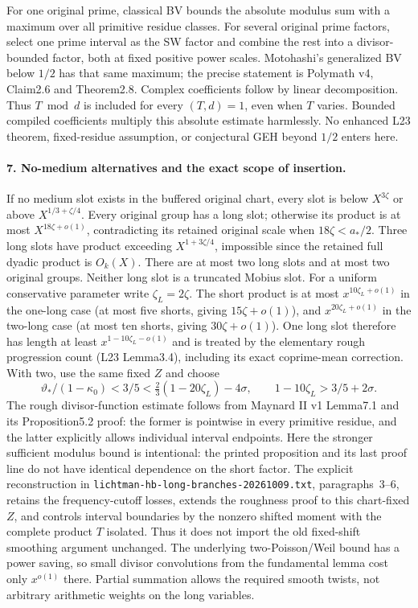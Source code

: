 For one original prime, classical BV bounds the absolute modulus sum
with a maximum over all primitive residue classes. For several original
prime factors, select one prime interval as the SW factor and combine
the rest into a divisor-bounded factor, both at fixed positive power
scales. Motohashi's generalized BV below $1/2$ has that same maximum;
the precise statement is Polymath v4, Claim2.6 and Theorem2.8. Complex
coefficients follow by linear decomposition. Thus $T\bmod d$ is included
for every $(T,d)=1$, even when $T$ varies. Bounded compiled coefficients
multiply this absolute estimate harmlessly. No enhanced L23 theorem,
fixed-residue assumption, or conjectural GEH beyond $1/2$ enters here.

\paragraph{7. No-medium alternatives and the exact scope of insertion.}
If no medium slot exists in the buffered original chart, every slot
is below $X^{3\zeta}$ or above $X^{1/3+\zeta/4}$. Every original group
has a long slot; otherwise its product is at most
$X^{18\zeta+o(1)}$, contradicting its retained original scale when
$18\zeta<a_*/2$. Three long slots have product exceeding
$X^{1+3\zeta/4}$, impossible since the retained full dyadic product
is $O_k(X)$. There are at most two long slots and at most two original
groups. Neither long slot is a truncated Mobius slot.
For a uniform conservative parameter write $\zeta_L=2\zeta$.
The short product is at most $x^{10\zeta_L+o(1)}$ in the one-long
case (at most five shorts, giving $15\zeta+o(1)$), and
$x^{20\zeta_L+o(1)}$ in the two-long case (at most ten shorts,
giving $30\zeta+o(1)$). One long slot therefore has length at least
$x^{1-10\zeta_L-o(1)}$ and is treated by the elementary rough progression
count (L23 Lemma3.4), including its exact coprime-mean correction.
With two, use the same fixed $Z$ and choose
\[
\vartheta_* /(1-\kappa_0)<3/5
 <\tfrac23(1-20\zeta_L)-4\sigma,\qquad
 1-10\zeta_L>3/5+2\sigma.
\]
The rough divisor-function estimate follows from Maynard II v1
Lemma7.1 and its Proposition5.2 proof: the former is pointwise in every
primitive residue, and the latter explicitly allows individual interval
endpoints. Here the stronger sufficient modulus bound is intentional:
the printed proposition and its last proof line do not have identical
dependence on the short factor. The explicit reconstruction in
\texttt{lichtman-hb-long-branches-20261009.txt}, paragraphs~3--6,
retains the frequency-cutoff losses, extends the roughness proof to
this chart-fixed $Z$, and controls interval boundaries by the nonzero
shifted moment with the complete product $T$ isolated. Thus it does
not import the old fixed-shift smoothing argument unchanged.
The underlying two-Poisson/Weil bound has a power saving, so small divisor
convolutions from the fundamental lemma cost only $x^{o(1)}$ there.
Partial summation allows the required smooth twists, not arbitrary
arithmetic weights on the long variables.

